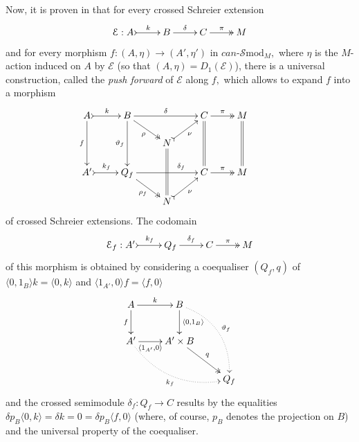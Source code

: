 \documentclass[a4paper]{amsart}
\theoremstyle{plain}
\theoremstyle{definition}
\theoremstyle{remark}
\newcommand{\la}{\langle}
\newcommand{\ra}{\rangle}
\begin{document}
Now, it is proven in \cite{AMMPS} that for every crossed Schreier extension
\begin{equation*}
\xymatrix{
{\mathcal{E}:A} \ar@{>->}[r]^-k &B \ar[r]^-{\delta} &C \ar@{->>}[r]^-{\pi} &{M} \\
}
\end{equation*}
and for every morphism $f\colon(A,\eta)\longrightarrow(A',\eta')$ in $can\text{-}\mathcal{S}\mathrm{mod}_M,$ where $\eta$ is the $M$-action induced on $A$ by $\mathcal{E}$ (so that $(A,\eta)=D_1(\mathcal{E})$), there is a universal construction, called the \emph{push forward} of $\mathcal{E}$ along $f,$ which allows to expand $f$ into a morphism
\begin{equation}
\label{eqn:pushforward}
\xymatrixrowsep{1.3pc}
\begin{aligned}
\xymatrix{
A \ar[dd]_-{f} \ar@{>->}[r]^-k &B \ar[dd]_-{\vartheta_f} \ar@{->>}[rd]_-{\rho} \ar[rr]^-{\delta} & \ &C  \ar@{=}[dd] \ar@{->>}[r]^-{\pi} &{M}  \ar@{=}[dd] \\
 &\ &N \ar@{=}[dd] \ar@{>->}[ru]_-{\nu}&\ &\ &\ \\
{A'} \ar@{>->}[r]^-{k_f} &{Q_f} \ar@{->>}[rd]_-{\rho_f} \ar[rr]^(.70){\delta_f} & \ &{C} \ar@{->>}[r]^-{\pi} &{M} \\
 &\ &{N} \ar@{>->}[ru]_-{\nu}&\ &\ &\
}
\end{aligned}
\end{equation}
of crossed Schreier extensions. The codomain
\begin{equation*}
\xymatrix{
{\mathcal{E}_f:A'} \ar@{>->}[r]^-{k_f} &{Q_f} \ar[r]^-{\delta_f} &C \ar@{->>}[r]^-{\pi} &{M}
}
\end{equation*}
of this morphism is obtained by considering a coequaliser $(Q_f,q)$ of $\la0,1_B\ra k=\la 0,k\ra$ and $\la 1_{A'},0\ra f=\la f,0\ra$
\begin{equation}
\label{eqn:costr_Q}
\begin{aligned}
\xymatrix{
A \ar[d]_-{f} \ar[r]^-k &{B} \ar[d]^-{\la0,1_B\ra} \ar@/^1.5pc/@{.>}[rdd]^-{\vartheta_f} &\ \\
{A'} \ar@/_1.5pc/@{.>}[rrd]_-{k_f} \ar[r]_-{\la1_{A'},0\ra} &{A'\times B} \ar@{->>}[rd]^-{q} &\ \\
&\ &{Q_f}
}
\end{aligned}
\end{equation}
and the crossed semimodule $\delta_f\colon Q_f\longrightarrow C$ results by the equalities $\delta p_B\la0,k\ra=\delta k=0=\delta p_B\la f,0\ra$ (where, of course, $p_B$ denotes the projection on $B$) and the universal property of the coequaliser.
\end{document}
